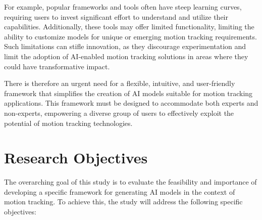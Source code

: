 

For example, popular frameworks and tools often have steep learning curves, requiring users to invest significant effort to understand and utilize their capabilities. Additionally, these tools may offer limited functionality, limiting the ability to customize models for unique or emerging motion tracking requirements. Such limitations can stifle innovation, as they discourage experimentation and limit the adoption of AI-enabled motion tracking solutions in areas where they could have transformative impact.

There is therefore an urgent need for a flexible, intuitive, and user-friendly framework that simplifies the creation of AI models suitable for motion tracking applications. This framework must be designed to accommodate both experts and non-experts, empowering a diverse group of users to effectively exploit the potential of motion tracking technologies.

\section{Research Objectives}


The overarching goal of this study is to evaluate the feasibility and importance of developing a specific framework for generating AI models in the context of motion tracking. To achieve this, the study will address the following specific objectives:

